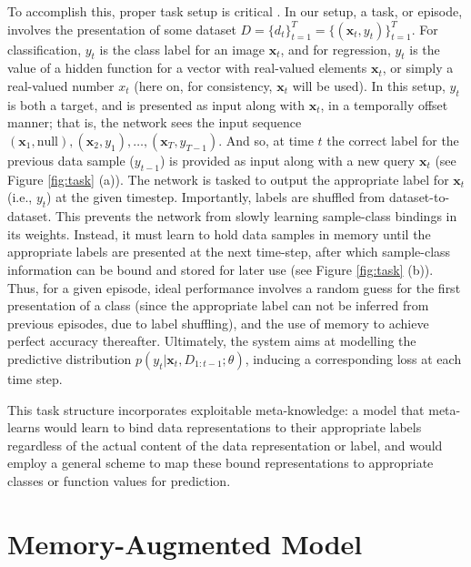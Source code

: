 \documentclass{article}
\begin{document}
To accomplish this, proper task setup is critical \cite{hochreiter2001learning}. In our setup, a task, or episode, involves the presentation of some dataset $D=\{d_t\}_{t=1}^T=\{(\mathbf{x}_t, y_t)\}_{t=1}^T$. For classification, $y_t$ is the class label for an image $\mathbf{x}_t$, and for regression, $y_t$ is the value of a hidden function for a vector with real-valued elements $\mathbf{x}_t$, or simply a real-valued number $x_t$ (here on, for consistency, $\mathbf{x}_t$ will be used). In this setup, $y_t$ is both a target, and is presented as input along with $\mathbf{x}_t$, in a temporally offset manner; that is, the network sees the input sequence $(\mathbf{x}_1, \text{null}), (\mathbf{x}_2, y_1), \ldots, (\mathbf{x}_T, y_{T-1})$. And so, at time $t$ the correct label for the previous data sample ($y_{t-1}$) is provided as input along with a new query $\mathbf{x}_t$ (see Figure \ref{fig:task} (a)). The network is tasked to output the appropriate label for $\mathbf{x}_t$ (i.e., $y_t$) at the given timestep. Importantly, labels are shuffled from dataset-to-dataset. This prevents the network from slowly learning sample-class bindings in its weights. Instead, it must learn to hold data samples in memory until the appropriate labels are presented at the next time-step, after which sample-class information can be bound and stored for later use (see Figure \ref{fig:task} (b)). Thus, for a given episode, ideal performance involves a random guess for the first presentation of a class (since the appropriate label can not be inferred from previous episodes, due to label shuffling), and the use of memory to achieve perfect accuracy thereafter. Ultimately, the system aims at modelling the predictive distribution $p(y_t | \mathbf{x}_t, D_{1:t-1}; \theta)$, inducing a corresponding loss at each time step. 

This task structure incorporates exploitable meta-knowledge: a model that meta-learns would learn to bind data representations to their appropriate labels regardless of the actual content of the data representation or label, and would employ a general scheme to map these bound representations to appropriate classes or function values for prediction.

 

\section{Memory-Augmented Model}
\end{document}
